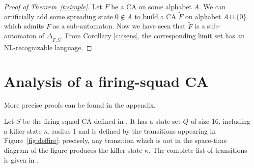 \documentclass{jac}
\theoremstyle{definition}
\begin{document}
\begin{proof}[Proof of Theorem~\ref{t:simple}]
Let $F$ be a CA on some alphabet $A$. We can artificially add some spreading
state $0\notin A$ to build a CA $\tilde F$ on alphabet $A\sqcup\{0\}$ which
admits $F$ as a sub-automaton. Now we have seen that $\tilde F$ is a sub-automaton
of $\Delta_{\tilde F,S}$. From Corollary
\ref{c:csens}, the corresponding limit set has an NL-recognizable language.
\end{proof}











\section{Analysis of a firing-squad CA}
\label{sec:fsproof}

More precise proofs can be found in the appendix.

Let $S$ be the firing-squad CA defined in \cite{rice}. It has a state set $Q$ of
size 16, including a killer state $\kappa$, radius 1 and is defined by the
transitions appearing in Figure~\ref{fig:deffire}: precisely, any transition
which is not in the space-time diagram of the figure produces the killer state
$\kappa$. The complete list of transitions is given in \cite{rice}.

\newcommand\st[4]{{\draw[fill=#4] (#2,#3)
    -- ++(1,0) -- ++(0,1)--++(-1,0)--cycle;\draw (#2,#3)+(.5,.5) node {\Tiny #1};}}
\newcommand\pointB[2]{}
\newcommand\pointF[2]{\st{\#}{#1}{#2}{gray}}
\newcommand\pointS[2]{\st{\#'}{#1}{#2}{gray!50!white}}
\newcommand\pointSp[2]{\st{$\gamma$}{#1}{#2}{yellow!50!white}}
\newcommand\pointXXXXX[2]{\st{$L_1$}{#1}{#2}{blue!50!white}}
\newcommand\pointXXXXXX[2]{\st{$l_1$}{#1}{#2}{blue!50!white}}
\newcommand\pointXXXXXXX[2]{\st{$R_1$}{#1}{#2}{red!50!white}}
\newcommand\pointXXXXXXXX[2]{\st{$r_1$}{#1}{#2}{red!50!white}}
\newcommand\pointXXXXXXXXX[2]{\st{$l_2$}{#1}{#2}{blue!20!white}}
\newcommand\pointXXXXXXXXXX[2]{\st{$l_2$}{#1}{#2}{blue!70!white}}
\newcommand\pointXXXXXXXXXXX[2]{\st{$r_2$}{#1}{#2}{red!20!white}}
\newcommand\pointXXXXXXXXXXXX[2]{\st{$r_2$}{#1}{#2}{red!70!white}}
\newcommand\pointXXXXXXXXXXXXX[2]{\st{X}{#1}{#2}{green!50!white}}
\newcommand\pointXXXXXXXXXXXXXX[2]{\st{Y}{#1}{#2}{green!50!white}}
\newcommand\pointXXXXXXXXXXXXXXX[2]{\st{Z}{#1}{#2}{green!50!white}}
\end{document}
